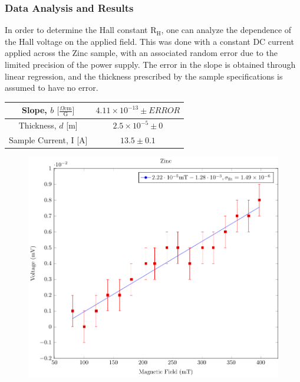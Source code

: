 \documentclass[a4paper]{article}
\begin{document}
\subsubsection{Data Analysis and Results}
\qq In order to determine the Hall constant $\text{R}_\text{H}$, one can
analyze the dependence of the Hall voltage on the applied field. This
was done with a constant DC current applied across the Zinc sample, with
an associated random error due to the limited precision of the power
supply. The error in the slope is obtained through linear regression,
and the thickness prescribed by the sample specifications is assumed
to have no error.

\begin{center}
\begin{tabular}{|c|c|}
\hline Slope, $b$ $\big[ \frac{\Omega \text{cm}}{\text{G}} \big] $ &
$4.11 \times 10^{-13} \pm ERROR$ \topVspace \bottomVspace \\ \hline
Thickness, $d$ [m] & $2.5 \times 10^{-5} \pm
0$ \topVspace \bottomVspace \\ \hline Sample Current, I [A] & $13.5
\pm 0.1$ \topVspace \bottomVspace \\ \hline
\end{tabular}
\label{table:zinc_RH}
\end{center}

\begin{figure}[H]
  \begin{center}
    \includegraphics[scale=0.7]{ZincPlot/zincPlot.pdf}
  \end{center}
\end{figure}
\end{document}
